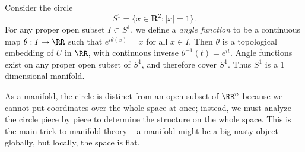 \begin{example}
    Consider the circle
    \[ S^1 = \{ x \in \mathbf{R}^2 : |x| = 1 \}. \]
    For any proper open subset $I \subset S^1$, we define a \emph{angle function} to be a continuous map $\theta: I \to \RR$ such that $e^{i\theta(x)} = x$ for all $x \in I$. Then $\theta$ is a topological embedding of $U$ in $\RR$, with continuous inverse $\theta^{-1}(t) = e^{it}$. Angle functions exist on any proper open subset of $S^1$, and therefore cover $S^1$. Thus $S^1$ is a 1 dimensional manifold.
\end{example}



As a manifold, the circle is distinct from an open subset of $\RR^n$ because we cannot put coordinates over the whole space at once; instead, we must analyze the circle piece by piece to determine the structure on the whole space. This is the main trick to manifold theory -- a manifold might be a big nasty object globally, but locally, the space is flat.

